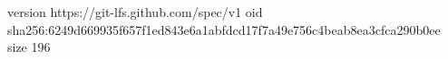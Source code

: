 version https://git-lfs.github.com/spec/v1
oid sha256:6249d669935f657f1ed843e6a1abfdcd17f7a49e756c4beab8ea3cfca290b0ee
size 196
